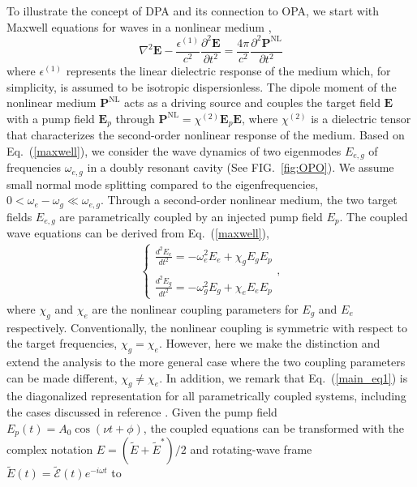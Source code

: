 \documentclass[aps,prl,nobibnotes,nofootinbib,showpacs,reprint]{revtex4-1}
\newcommand{\vect}[1]{\mathbf{#1}}
\newcommand{\Fig}[1]{FIG.~\ref{#1}}
\newcommand{\Eq}[1]{Eq.~(\ref{#1})}
\newcommand{\we}{\omega_{e}}
\newcommand{\wg}{\omega_{g}}
\newcommand{\chie}{\chi_{e}}
\newcommand{\chig}{\chi_{g}}
\begin{document}
To illustrate the concept of DPA and its connection to OPA, we start with Maxwell equations for waves in a nonlinear medium \cite{Boyd},
\begin{equation}\label{maxwell}
	\nabla^2\vect{E} - \frac{\epsilon^{(1)}}{c^2}\frac{\partial^2\vect{E}}{\partial t^2} = \frac{4\pi}{c^2}\frac{\partial^2 \vect{P}^{\textrm{NL}}}{\partial t^2}
\end{equation}
where $\epsilon^{(1)}$ represents the linear dielectric response of the medium which, for simplicity, is assumed to be isotropic dispersionless. The dipole moment of the nonlinear medium $\vect{P}^{\textrm{NL}}$ acts as a driving source and couples the target field $\vect{E}$ with a pump field $\vect{E}_{p}$ through $\vect{P}^{\textrm{NL}} = \chi^{(2)}\vect{E}_{p}\vect{E}$, where $\chi^{(2)}$ is a dielectric tensor that characterizes the second-order nonlinear response of the medium. Based on \Eq{maxwell}, we consider the wave dynamics of two eigenmodes $E_{e,g}$ of frequencies $\omega_{e,g}$ in a doubly resonant cavity (See \Fig{fig:OPO}). We assume small normal mode splitting compared to the eigenfrequencies, $0 < \we-\wg \ll \omega_{e,g}$. Through a second-order nonlinear medium, the two target fields $E_{e,g}$ are parametrically coupled by an injected pump field $E_{p}$. The coupled wave equations can be derived from \Eq{maxwell},
\begin{equation}\label{main_eq1}
	\begin{split}
	\left\{
	\begin{array}{l}
	\displaystyle \frac{d^2 E_{e}}{dt^2} = -\we^2 E_{e}+ \chig E_{g}E_{p}	\\	\\
	\displaystyle \frac{d^2 E_{g}}{dt^2} = -\wg^2 E_{g} + \chie E_{e}E_{p}			
	\end{array}
	\right. 	,
	\end{split}
\end{equation}
where $\chig$ and $\chie$ are the nonlinear coupling parameters for $E_{g}$ and $E_{e}$ respectively. Conventionally, the nonlinear coupling is symmetric with respect to the target frequencies, $\chig = \chie$. However, here we make the distinction and extend the analysis to the more general case where the two coupling parameters can be made different, $\chig \ne \chie$. In addition, we remark that \Eq{main_eq1} is the diagonalized representation for all parametrically coupled systems, including the cases discussed in reference \cite{Svidzinsky1, Svidzinsky2, Chen, Zhang}. Given the pump field $E_{p}(t) = A_{0}\cos{(\nu t + \phi)}$, the coupled equations can be transformed with the complex notation $E = (\tilde{E} +\tilde{E}^{\ast})/2$ and rotating-wave frame $\tilde{E}(t) = \tilde{\mathcal{E}}(t) e^{-i\omega t}$ to 
\end{document}
